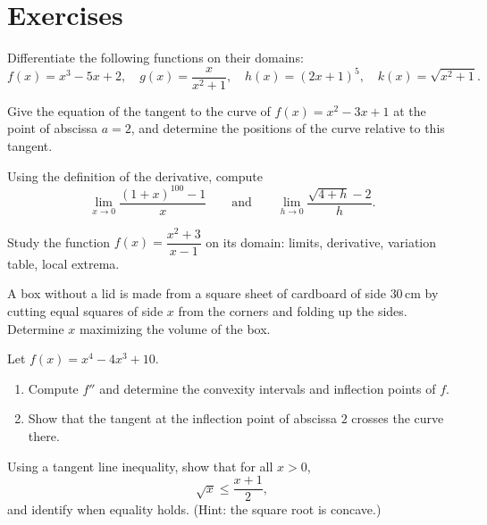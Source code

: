 \section{Exercises}

\begin{exercise}[$\star$]\label{exo:tle:deriv:1}
Differentiate the following functions on their domains:
\[
f(x) = x^3 - 5x + 2, \quad
g(x) = \frac{x}{x^2+1}, \quad
h(x) = (2x+1)^5, \quad
k(x) = \sqrt{x^2 + 1}.
\]
\end{exercise}

\begin{exercise}[$\star$]\label{exo:tle:deriv:2}
Give the equation of the tangent to the curve of $f(x) = x^2 - 3x + 1$ at
the point of abscissa $a = 2$, and determine the positions of the curve
relative to this tangent.
\end{exercise}

\begin{exercise}[$\star$]\label{exo:tle:deriv:3}
Using the definition of the derivative, compute
\[
\lim_{x \to 0} \frac{(1+x)^{100} - 1}{x}
\qquad\text{and}\qquad
\lim_{h \to 0} \frac{\sqrt{4+h} - 2}{h}.
\]
\end{exercise}

\begin{exercise}[$\star\star$]\label{exo:tle:deriv:4}
Study the function $f(x) = \dfrac{x^2 + 3}{x - 1}$ on its domain: limits,
derivative, variation table, local extrema.
\end{exercise}

\begin{exercise}[$\star\star$]\label{exo:tle:deriv:5}
A box without a lid is made from a square sheet of cardboard of side
$30\,$cm by cutting equal squares of side $x$ from the corners and folding up
the sides. Determine $x$ maximizing the volume of the box.
\end{exercise}

\begin{exercise}[$\star\star$]\label{exo:tle:deriv:6}
Let $f(x) = x^4 - 4x^3 + 10$.
\begin{enumerate}
  \item Compute $f''$ and determine the convexity intervals and inflection
        points of $f$.
  \item Show that the tangent at the inflection point of abscissa $2$
        crosses the curve there.
\end{enumerate}
\end{exercise}

\begin{exercise}[$\star\star$]\label{exo:tle:deriv:7}
Using a tangent line inequality, show that for all $x > 0$,
\[
\sqrt{x} \leq \frac{x + 1}{2},
\]
and identify when equality holds. (Hint: the square root is concave.)
\end{exercise}

